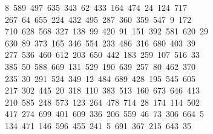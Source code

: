 \begin{tabbing}
\ 8\ 589\ 497\ 635\ 343\ 62\ 433\ 164\ 474\ 24\ 124\ 717\ \\[0pt]
\ 267\ 64\ 655\ 224\ 432\ 495\ 287\ 360\ 359\ 547\ 9\ 172\\[0pt]
\>\ 710\ 628\ 568\ 327\ 138\ 99\ 420\ 91\ 151\ 392\ 581\ 620\ 29\\[0pt]
\ 630\ 89\ 373\ 165\ 346\ 554\ 233\ 486\ 316\ 680\ 403\ 39\ \\[0pt]
\ 277\ 536\ 460\ 612\ 203\ 650\ 442\ 183\ 259\ 107\ 516\ 33\\[0pt]
\ 385\ 50\ 588\ 669\ 131\ 529\ 190\ 639\ 257\ 80\ 462\ 370\ \\[0pt]
\ 235\ 30\ 291\ 524\ 349\ 12\ 484\ 689\ 428\ 195\ 545\ 605\\[0pt]
\>\ 217\ 302\ 445\ 20\ 318\ 110\ 383\ 513\ 160\ 673\ 646\ 413\ \\[0pt]
\ 210\ 585\ 248\ 573\ 123\ 264\ 478\ 714\ 28\ 174\ 114\ 502\\[0pt]
\>\ 417\ 274\ 699\ 401\ 609\ 336\ 206\ 559\ 46\ 73\ 306\ 664\ 5\\[0pt]
\ 134\ 471\ 146\ 596\ 455\ 241\ 5\ 691\ 367\ 215\ 643\ 35\ \\[0pt]

\end{tabbing}
